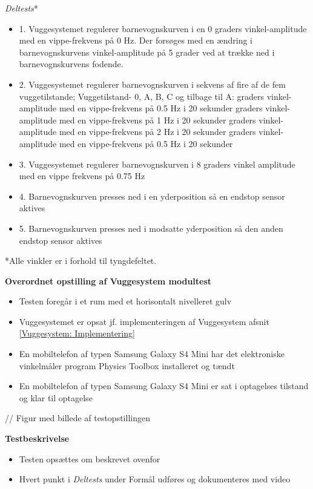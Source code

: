 \textit{Deltests}*
\begin{itemize}
	\item 1. Vuggesystemet regulerer barnevognskurven i en 0 graders vinkel-amplitude med en vippe-frekvens på 0 Hz. Der forsøges med en ændring i  barnevognskurvens vinkel-amplitude på 5 grader ved at trække ned i barnevognskurvens fodende. 
	\item 2. Vuggesystemet regulerer barnevognskurven i sekvens af fire af de fem vuggetilstande; Vuggetilstand- 0, A, B, C og tilbage til A: 
		 graders vinkel-amplitude med en vippe-frekvens på 0.5 Hz i 20 sekunder 
		 graders vinkel-amplitude med en vippe-frekvens på 1 Hz i 20 sekunder  
		 graders vinkel-amplitude med en vippe-frekvens på 2 Hz i 20 sekunder 
		 graders vinkel-amplitude med en vippe-frekvens på 0.5 Hz i 20 sekunder
	\item 3. Vuggesystemet regulerer barnevognskurven i 8 graders vinkel amplitude med en vippe frekvens på 0.75 Hz
	\item 4. Barnevognskurven presses ned i en yderposition så en endstop sensor aktives
	\item 5. Barnevognskurven presses ned i modsatte yderposition så den anden endstop sensor aktives
\end{itemize}
*Alle vinkler er i forhold til tyngdefeltet.


\textbf{Overordnet opstilling af Vuggesystem modultest}

\begin{itemize}
	\item Testen foregår i et rum med et horisontalt nivelleret gulv
	\item Vuggesystemet er opsat jf. implementeringen af Vuggesystem afsnit \vref{Vuggesystem: Implementering}
	\item En mobiltelefon af typen Samsung Galaxy S4 Mini \citep{website:Samsung} har det elektroniske vinkelmåler program Physics Toolbox \citep{website:physicstoolbox} installeret og tændt
	\item En mobiltelefon af typen Samsung Galaxy S4 Mini er sat i optagelses tilstand og klar til optagelse
\end{itemize}
// Figur med billede af testopstillingen

\textbf{Testbeskrivelse}
\begin{itemize}
	\item Testen opsættes om beskrevet ovenfor
	\item Hvert punkt i \textit{Deltests} under Formål udføres og dokumenteres med video
\end{itemize}

